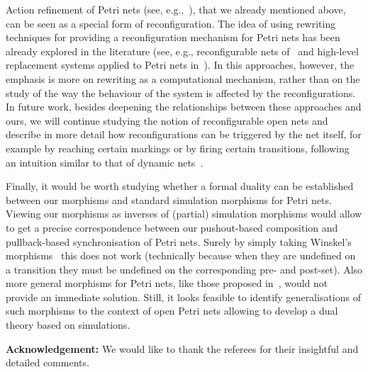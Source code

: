 \documentclass{LMCS}
\begin{document}
Action refinement of Petri nets (see,
e.g.,~\cite{v:petri-stepwise-refine,SM83,Mul85,Vog87}), that we
already mentioned above, can be seen as a special form of
reconfiguration.
The idea of using rewriting techniques for providing a reconfiguration
mechanism for Petri nets has been already explored in the literature
(see, e.g., reconfigurable nets of~\cite{BLO:MCSRN,LO:ISDC} and
high-level replacement systems applied to Petri nets
in~\cite{PER:HLRA}).
In this approaches, however, the emphasis is more on rewriting as a
computational mechanism, rather than on the study of the way the
behaviour of the system is affected by the reconfigurations.
In future work, besides deepening the relationships between these
approaches and ours, we will continue studying the notion of
reconfigurable open nets and describe in more detail how
reconfigurations can be triggered by the net itself, for example by
reaching certain markings or by firing certain transitions, following
an intuition similar to that of dynamic nets~\cite{BS:HLPNTTJC}.


Finally, it would be worth studying whether a formal duality 
can be established between our morphisms and standard simulation
morphisms for Petri nets. Viewing our morphisms as inverses of
(partial) simulation morphisms would allow to get a precise
correspondence between our pushout-based composition and
pullback-based synchronisation of Petri nets.
Surely by simply taking Winskel's morphisms~\cite{Win:ES} this does
not work (technically because when they are undefined on a transition
they must be undefined on the corresponding pre- and post-set). Also
more general morphisms for Petri nets, like those proposed
in~\cite{Vog:ENPS,BB:GMPN}, would not provide an immediate solution.
Still, it looks feasible to identify generalisations of such morphisms
to the context of open Petri nets allowing to develop a dual
theory based on simulations.

\medskip

\noindent\textbf{Acknowledgement:} We would like to thank the 
referees for their insightful and detailed comments.



\end{document}
